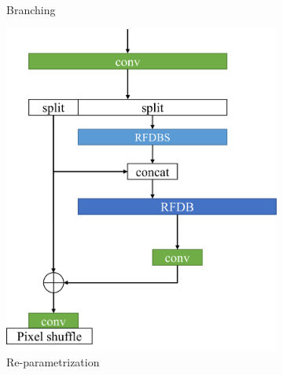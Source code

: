 \documentclass{article}
\begin{document}
\begin{figure}
\begin{subfigure}[b]{0.49\linewidth}
        \caption{Branching}
        \label{fig:Branching}
    \end{subfigure}
    \begin{subfigure}[b]{0.49\linewidth}
		\centering
        \includegraphics[width=\textwidth]{../Re-parametrization.pdf}
        \caption{Re-parametrization}
        \label{fig:Re-parametrization}
    \end{subfigure}
    \begin{subfigure}[b]{0.49\linewidth}
		\centering

\end{subfigure}
\end{figure}
\end{document}

